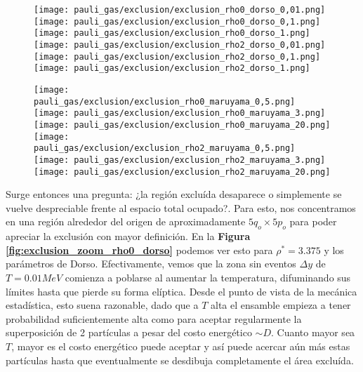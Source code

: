 \begin{figure}[H]
	\centering	%
	\texttt{[image: pauli\_gas/exclusion/exclusion\_rho0\_dorso\_0,01.png]}
	\texttt{[image: pauli\_gas/exclusion/exclusion\_rho0\_dorso\_0,1.png]}
	\texttt{[image: pauli\_gas/exclusion/exclusion\_rho0\_dorso\_1.png]}
	\texttt{[image: pauli\_gas/exclusion/exclusion\_rho2\_dorso\_0,01.png]}
	\texttt{[image: pauli\_gas/exclusion/exclusion\_rho2\_dorso\_0,1.png]}
	\texttt{[image: pauli\_gas/exclusion/exclusion\_rho2\_dorso\_1.png]}
	\caption{}
	\label{fig:exclusion_dorso}
\end{figure}
\begin{figure}[H]
	\centering	%
	\texttt{[image: pauli\_gas/exclusion/exclusion\_rho0\_maruyama\_0,5.png]}
	\texttt{[image: pauli\_gas/exclusion/exclusion\_rho0\_maruyama\_3.png]}
	\texttt{[image: pauli\_gas/exclusion/exclusion\_rho0\_maruyama\_20.png]}
	\texttt{[image: pauli\_gas/exclusion/exclusion\_rho2\_maruyama\_0,5.png]}
	\texttt{[image: pauli\_gas/exclusion/exclusion\_rho2\_maruyama\_3.png]}
	\texttt{[image: pauli\_gas/exclusion/exclusion\_rho2\_maruyama\_20.png]}
	\caption{}
	\label{fig:exclusion_maruyama}
\end{figure}

Surge entonces una pregunta: ¿la región excluída desaparece o simplemente se vuelve despreciable frente al espacio total ocupado?.
Para esto, nos concentramos en una región alrededor del origen de aproximadamente $5q_o\times5p_o$ para poder apreciar la exclusión con mayor definición.
En la \textbf{Figura \ref{fig:exclusion_zoom_rho0_dorso}} podemos ver esto para $\rho^*=3.375$ y los parámetros de Dorso.
Efectivamente, vemos que la zona sin eventos $\Delta y$ de $T=0.01MeV$ comienza a poblarse al aumentar la temperatura, difuminando sus límites hasta que pierde
su forma elíptica.
Desde el punto de vista de la mecánica estadística, esto suena razonable, dado que a $T$ alta el ensamble empieza a tener probabilidad suficientemente alta como para 
aceptar regularmente la superposición de 2 partículas a pesar del costo energético $\sim D$.
Cuanto mayor sea $T$, mayor es el costo energético puede aceptar y así puede acercar aún más estas partículas hasta que eventualmente se desdibuja completamente el área excluída.

